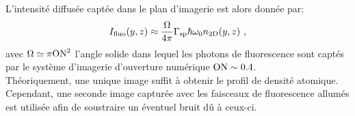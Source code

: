 L'intensité diffusée captée dans le plan d'imagerie est alors donnée par:
\begin{equation}
I_{\mathrm{fluo}}(y,z)\approx\frac{\Omega}{4\pi} \Gamma_{\mathrm{sp}}\hslash \omega_0 n_{\mathrm{2D}}(y,z) \text{ ,}
\label{eq:img_fluo}
\end{equation}
avec $\Omega \simeq \pi \mathrm{ON}^2$ l'angle solide dans lequel les photons de fluorescence sont captés par le système d'imagerie d'ouverture numérique $\mathrm{ON}\sim 0.4$. \\
Théoriquement, une unique image suffit à obtenir le profil de densité atomique. Cependant, une seconde image capturée avec les faisceaux de fluorescence allumés est utilisée afin de soustraire un éventuel bruit dû à ceux-ci. 



